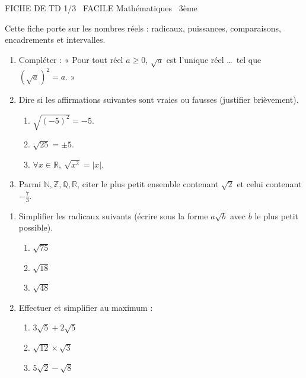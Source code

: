 \documentclass[11pt]{article}
\begin{document}
\begin{tcolorbox}[enhanced,colback=popink,colframe=popink,arc=10pt,boxrule=0pt,left=12pt,right=12pt,top=9pt,bottom=9pt]
{\color{white}\popxbold\small FICHE DE TD 1/3 \textbullet\ FACILE \hfill Mathématiques \textbullet\ 3ème\par}
\end{tcolorbox}
\vspace{4pt}
Cette fiche porte sur les nombres réels : radicaux, puissances, comparaisons, encadrements et intervalles.

\begin{exercice}
\begin{enumerate}
    \item Compléter : « Pour tout réel $a \geqslant 0$, $\sqrt{a}$ est l'unique réel \ldots\ tel que $(\sqrt{a})^2 = a$. »
    \item Dire si les affirmations suivantes sont vraies ou fausses (justifier brièvement).
    \begin{enumerate}
        \item $\sqrt{(-5)^2} = -5$.
        \item $\sqrt{25} = \pm 5$.
        \item $\forall x \in \mathbb{R},\ \sqrt{x^2} = |x|$.
    \end{enumerate}
    \item Parmi $\mathbb{N}, \mathbb{Z}, \mathbb{Q}, \mathbb{R}$, citer le plus petit ensemble contenant $\sqrt{2}$ et celui contenant $-\frac{7}{3}$.
\end{enumerate}
\end{exercice}

\begin{exercice}
\begin{enumerate}
    \item Simplifier les radicaux suivants (écrire sous la forme $a\sqrt{b}$ avec $b$ le plus petit possible).
    \begin{enumerate}
        \item $\sqrt{75}$
        \item $\sqrt{18}$
        \item $\sqrt{48}$
    \end{enumerate}
    \item Effectuer et simplifier au maximum :
    \begin{enumerate}
        \item $3\sqrt{5} + 2\sqrt{5}$
        \item $\sqrt{12} \times \sqrt{3}$
        \item $5\sqrt{2} - \sqrt{8}$
    \end{enumerate}
\end{enumerate}
\end{exercice}
\end{document}
